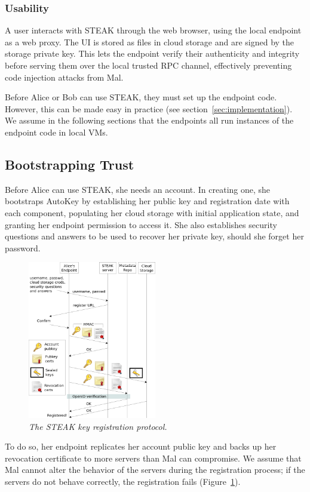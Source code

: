 \subsubsection{Usability}
A user interacts with STEAK through the web browser, using the local endpoint as a web proxy.  The UI is stored as files in cloud storage and are signed by the storage private key.  This lets the endpoint verify their authenticity and integrity before serving them over the local trusted RPC channel, effectively preventing code injection attacks from Mal.

Before Alice or Bob can use STEAK, they must set up the endpoint code.  However, this can be made easy in practice (see section~\ref{sec:implementation}).  We assume in the following sections that the endpoints all run instances of the endpoint code in local VMs.

\subsection{Bootstrapping Trust}
Before Alice can use STEAK, she needs an account.  In creating one, she bootstraps AutoKey by establishing her public key and registration date with each component, populating her cloud storage with initial application state, and granting her endpoint permission to access it.  She also establishes security questions and answers to be used to recover her private key, should she forget her password.

\begin{figure}[h!]
\centering
\includegraphics[width=0.5\textwidth]{figures/register}
\caption{\it The STEAK key registration protocol.}
\label{fig:register}
\end{figure}

To do so, her endpoint replicates her account public key and backs up her revocation certificate to more servers than Mal can compromise.  We assume that Mal cannot alter the behavior of the servers during the registration process; if the servers do not behave correctly, the registration fails (Figure~\ref{fig:register}).

